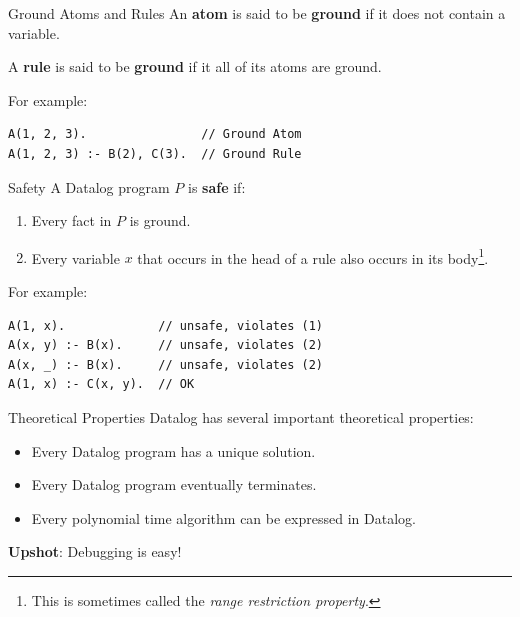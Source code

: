 \begin{frame}[fragile]{Ground Atoms and Rules}
An \textbf{atom} is said to be \textbf{ground} if it does not contain a variable.

A \textbf{rule} is said to be \textbf{ground} if it all of its atoms are ground.

For example:
\begin{lstlisting}[language=flix,xleftmargin=0.8cm]
A(1, 2, 3).                // Ground Atom
A(1, 2, 3) :- B(2), C(3).  // Ground Rule
\end{lstlisting}
\end{frame}

\begin{frame}[fragile]{Safety}
A Datalog program $P$ is \textbf{safe} if:
\begin{enumerate}
    \item Every fact in $P$ is ground.
    \item Every variable $x$ that occurs in the head of a rule also occurs in
    its body\footnote{This is sometimes called the \textsl{range restriction
    property}.}.
\end{enumerate}

For example:
\begin{lstlisting}[language=flix,xleftmargin=0.8cm]
A(1, x).             // unsafe, violates (1)
A(x, y) :- B(x).     // unsafe, violates (2)
A(x, _) :- B(x).     // unsafe, violates (2)
A(1, x) :- C(x, y).  // OK
\end{lstlisting}
\end{frame}

\begin{frame}{Theoretical Properties}
Datalog has several important theoretical properties:

\begin{itemize}
    \item Every Datalog program has a unique solution.
    \item Every Datalog program eventually terminates.
    \item Every polynomial time algorithm can be expressed in Datalog.
\end{itemize}

\medskip

\pause

\textbf{Upshot}: Debugging is easy! 

\end{frame}

